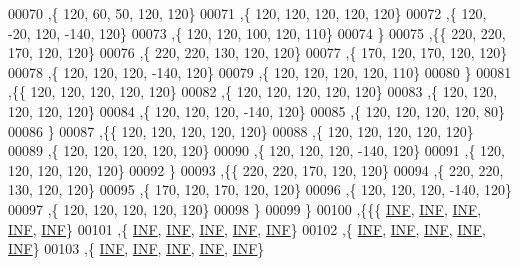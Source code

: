 \begin{DoxyCode}
00070   ,\{   120,    60,    50,   120,   120\}
00071   ,\{   120,   120,   120,   120,   120\}
00072   ,\{   120,   -20,   120,  -140,   120\}
00073   ,\{   120,   120,   100,   120,   110\}
00074   \}
00075  ,\{\{   220,   220,   170,   120,   120\}
00076   ,\{   220,   220,   130,   120,   120\}
00077   ,\{   170,   120,   170,   120,   120\}
00078   ,\{   120,   120,   120,  -140,   120\}
00079   ,\{   120,   120,   120,   120,   110\}
00080   \}
00081  ,\{\{   120,   120,   120,   120,   120\}
00082   ,\{   120,   120,   120,   120,   120\}
00083   ,\{   120,   120,   120,   120,   120\}
00084   ,\{   120,   120,   120,  -140,   120\}
00085   ,\{   120,   120,   120,   120,    80\}
00086   \}
00087  ,\{\{   120,   120,   120,   120,   120\}
00088   ,\{   120,   120,   120,   120,   120\}
00089   ,\{   120,   120,   120,   120,   120\}
00090   ,\{   120,   120,   120,  -140,   120\}
00091   ,\{   120,   120,   120,   120,   120\}
00092   \}
00093  ,\{\{   220,   220,   170,   120,   120\}
00094   ,\{   220,   220,   130,   120,   120\}
00095   ,\{   170,   120,   170,   120,   120\}
00096   ,\{   120,   120,   120,  -140,   120\}
00097   ,\{   120,   120,   120,   120,   120\}
00098   \}
00099  \}
00100 ,\{\{\{   \mbox{\hyperlink{1_88_84__epars_8h_a12c2040f25d8e3a7b9e1c2024c618cb6}{INF}},   \mbox{\hyperlink{1_88_84__epars_8h_a12c2040f25d8e3a7b9e1c2024c618cb6}{INF}},   \mbox{\hyperlink{1_88_84__epars_8h_a12c2040f25d8e3a7b9e1c2024c618cb6}{INF}},   \mbox{\hyperlink{1_88_84__epars_8h_a12c2040f25d8e3a7b9e1c2024c618cb6}{INF}},   \mbox{\hyperlink{1_88_84__epars_8h_a12c2040f25d8e3a7b9e1c2024c618cb6}{INF}}\}
00101   ,\{   \mbox{\hyperlink{1_88_84__epars_8h_a12c2040f25d8e3a7b9e1c2024c618cb6}{INF}},   \mbox{\hyperlink{1_88_84__epars_8h_a12c2040f25d8e3a7b9e1c2024c618cb6}{INF}},   \mbox{\hyperlink{1_88_84__epars_8h_a12c2040f25d8e3a7b9e1c2024c618cb6}{INF}},   \mbox{\hyperlink{1_88_84__epars_8h_a12c2040f25d8e3a7b9e1c2024c618cb6}{INF}},   \mbox{\hyperlink{1_88_84__epars_8h_a12c2040f25d8e3a7b9e1c2024c618cb6}{INF}}\}
00102   ,\{   \mbox{\hyperlink{1_88_84__epars_8h_a12c2040f25d8e3a7b9e1c2024c618cb6}{INF}},   \mbox{\hyperlink{1_88_84__epars_8h_a12c2040f25d8e3a7b9e1c2024c618cb6}{INF}},   \mbox{\hyperlink{1_88_84__epars_8h_a12c2040f25d8e3a7b9e1c2024c618cb6}{INF}},   \mbox{\hyperlink{1_88_84__epars_8h_a12c2040f25d8e3a7b9e1c2024c618cb6}{INF}},   \mbox{\hyperlink{1_88_84__epars_8h_a12c2040f25d8e3a7b9e1c2024c618cb6}{INF}}\}
00103   ,\{   \mbox{\hyperlink{1_88_84__epars_8h_a12c2040f25d8e3a7b9e1c2024c618cb6}{INF}},   \mbox{\hyperlink{1_88_84__epars_8h_a12c2040f25d8e3a7b9e1c2024c618cb6}{INF}},   \mbox{\hyperlink{1_88_84__epars_8h_a12c2040f25d8e3a7b9e1c2024c618cb6}{INF}},   \mbox{\hyperlink{1_88_84__epars_8h_a12c2040f25d8e3a7b9e1c2024c618cb6}{INF}},   \mbox{\hyperlink{1_88_84__epars_8h_a12c2040f25d8e3a7b9e1c2024c618cb6}{INF}}\}

\end{DoxyCode}
